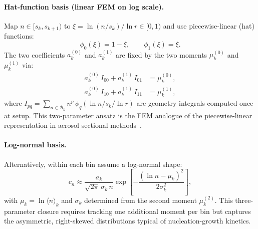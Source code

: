 \documentclass[pdflatex,sn-basic]{sn-jnl} %
\begin{document}
\paragraph{Hat-function basis (linear FEM on log scale).}
Map $n \in [s_k, s_{k+1})$ to $\xi = \ln(n/s_k)/\ln r \in [0,1)$
and use piecewise-linear (hat) functions:
\begin{equation}\label{eq:hat_basis}
    \phi_0(\xi) = 1 - \xi, \qquad \phi_1(\xi) = \xi.
\end{equation}
The two coefficients $a_k^{(0)}$ and $a_k^{(1)}$ are fixed by the
two moments $\mu_k^{(0)}$ and $\mu_k^{(1)}$ via:
\begin{align}
    a_k^{(0)}\,I_{00} + a_k^{(1)}\,I_{01} &= \mu_k^{(0)},
    \label{eq:hat_moment0}\\
    a_k^{(0)}\,I_{10} + a_k^{(1)}\,I_{11} &= \mu_k^{(1)},
    \label{eq:hat_moment1}
\end{align}
where $I_{pq} = \sum_{n \in \mathcal{B}_k} n^p\,\phi_q(\ln n/s_k/\ln r)$
are geometry integrals computed once at setup. This two-parameter
ansatz is the FEM analogue of the piecewise-linear representation in
aerosol sectional methods~\cite{Adams2002,Jacobson1994}.

\paragraph{Log-normal basis.}
Alternatively, within each bin assume a log-normal shape:
\begin{equation}\label{eq:lognormal_ansatz}
    c_n \approx \frac{a_k}{\sqrt{2\pi}\,\sigma_k\,n}
    \exp\!\left[-\frac{(\ln n - \mu_k)^2}{2\sigma_k^2}\right],
\end{equation}
with $\mu_k = \ln\langle n\rangle_k$ and $\sigma_k$ determined from
the second moment $\mu_k^{(2)}$. This three-parameter closure
requires tracking one additional moment per bin but captures the
asymmetric, right-skewed distributions typical of nucleation-growth
kinetics.
\end{document}
